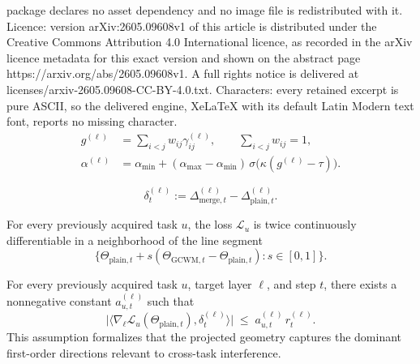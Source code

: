 \documentclass[10pt,a4paper]{amsart}
\begin{document}
package declares no asset dependency and no image file is redistributed with it. Licence: version arXiv:2605.09608v1 of this article is distributed under the Creative Commons Attribution 4.0 International licence, as recorded in the arXiv licence metadata for this exact version and shown on the abstract page https://arxiv.org/abs/2605.09608v1. A full rights notice is delivered at licenses/arxiv-2605.09608-CC-BY-4.0.txt. Characters: every retained excerpt is pure ASCII, so the delivered engine, XeLaTeX with its default Latin Modern text font, reports no missing character.
\begin{align}
g^{(\ell)}
&=
\sum_{i<j}w_{ij}\gamma_{ij}^{(\ell)},
\qquad
\sum_{i<j}w_{ij}=1,
\label{eq:layer-geometry-conflict}
\\
\alpha^{(\ell)}
&=
\alpha_{\min}
+
(\alpha_{\max}-\alpha_{\min})
\,\sigma\!\big(\kappa(g^{(\ell)}-\tau)\big).
\label{eq:conflict-gate}
\end{align}

\begin{equation}
\delta_t^{(\ell)}
:=
\Delta_{\mathrm{merge},t}^{(\ell)}-\Delta_{\mathrm{plain},t}^{(\ell)}.
\label{eq:delta_def_appendix_final}
\end{equation}

\begin{assumption}
\label{ass:local_smoothness_appendix_final}
For every previously acquired task \(u\), the loss \(\mathcal L_u\) is twice continuously differentiable in a neighborhood of the line segment
\[
\bigl\{
\Theta_{\mathrm{plain},t}+s(\Theta_{\mathrm{GCWM},t}-\Theta_{\mathrm{plain},t})
: s\in[0,1]
\bigr\}.
\]
\end{assumption}

\begin{assumption}
\label{ass:geometry_adequacy_appendix_final}
For every previously acquired task \(u\), target layer \(\ell\), and step \(t\), there exists a nonnegative constant \(a_{u,t}^{(\ell)}\) such that
\begin{equation}
\bigl|
\langle
\nabla_{\ell}\mathcal L_u(\Theta_{\mathrm{plain},t}),
\delta_t^{(\ell)}
\rangle
\bigr|
\;\le\;
a_{u,t}^{(\ell)}\, r_t^{(\ell)}.
\label{eq:geometry_adequacy_appendix_final}
\end{equation}
This assumption formalizes that the projected geometry captures the dominant first-order directions relevant to cross-task interference.
\end{assumption}
\end{document}
